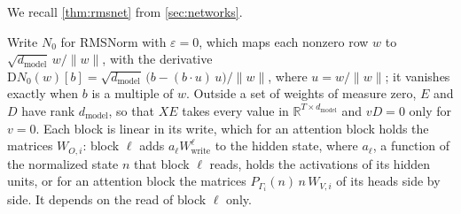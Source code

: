 \documentclass[10pt]{article}
\theoremstyle{definition}
\theoremstyle{remark}
\newcommand{\R}{\mathbb{R}}
\newcommand{\Wwrite}{W_{\mathrm{write}}}
\newcommand{\dm}{d_{\mathrm{model}}}
\newcommand{\Der}{\mathrm{D}}
\newcommand{\norm}[1]{\lVert #1\rVert}
\begin{document}
We recall \cref{thm:rmsnet} from \cref{sec:networks}.
\thmRMSNet*

Write $N_0$ for RMSNorm with $\varepsilon = 0$, which maps each nonzero row $w$ to $\sqrt{\dm}\,w/\norm{w}$, with the derivative $\Der N_0(w)[b] = \sqrt{\dm}\,\big(b - (b\cdot u)\,u\big)/\norm{w}$, where $u = w/\norm{w}$; it vanishes exactly when $b$ is a multiple of $w$. Outside a set of weights of measure zero, $E$ and $D$ have rank $\dm$, so that $XE$ takes every value in $\R^{T\times\dm}$ and $vD = 0$ only for $v = 0$. Each block is linear in its write, which for an attention block holds the matrices $W_{O,i}$: block $\ell$ adds $a_\ell\Wwrite^{\ell}$ to the hidden state, where $a_\ell$, a function of the normalized state $n$ that block $\ell$ reads, holds the activations of its hidden units, or for an attention block the matrices $P_{\Gamma_i}(n)\,n\,W_{V,i}$ of its heads side by side. It depends on the read of block $\ell$ only.
\end{document}
